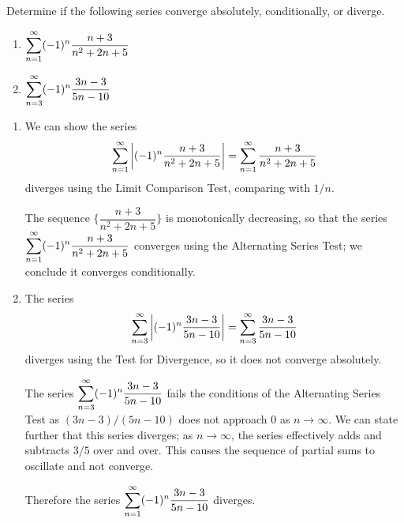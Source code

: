 \begin{example}\label{ex_alt_series2}%
Determine if the following series converge absolutely, conditionally, or diverge.\\
\begin{minipage}{.5\textwidth}
 \begin{enumerate}
  \item $\displaystyle\sum_{n=1}^\infty (-1)^n\frac{n+3}{n^2+2n+5}$
 \end{enumerate}
\end{minipage}%
\begin{minipage}{.5\textwidth}
 \begin{enumerate}\setcounter{enumi}{1}
  \item $\displaystyle\sum_{n=3}^\infty (-1)^n\frac{3n-3}{5n-10}$
 \end{enumerate}
\end{minipage}
\solution
\begin{enumerate}
	\item We can show the series
	\[\sum_{n=1}^\infty \left\lvert (-1)^n\frac{n+3}{n^2+2n+5} \right\rvert= \sum_{n=1}^\infty \frac{n+3}{n^2+2n+5}\]
	diverges using the Limit Comparison Test, comparing with $1/n$. 
	
	The sequence $\{\dfrac{n+3}{n^2+2n+5}\}$ is monotonically decreasing, so that the series $\displaystyle \sum_{n=1}^\infty (-1)^n\frac{n+3}{n^2+2n+5}$ converges using the Alternating Series Test; we conclude it converges conditionally.
	
%	
	
	\item	The series
	\[\sum_{n=3}^\infty \left\lvert (-1)^n\frac{3n-3}{5n-10} \right\rvert = \sum_{n=3}^\infty \frac{3n-3}{5n-10}\]
	diverges using the Test for Divergence, so it does not converge absolutely. 
	
	The series $\displaystyle \sum_{n=3}^\infty (-1)^n\frac{3n-3}{5n-10}$ fails the conditions of the Alternating Series Test as $(3n-3)/(5n-10)$ does not approach $0$ as $n\to\infty$. We can state further that this series diverges; as $n\to\infty$, the series effectively adds and subtracts $3/5$ over and over. This causes the sequence of partial sums to oscillate and not converge.
	
	Therefore the series $\displaystyle \sum_{n=1}^\infty (-1)^n\frac{3n-3}{5n-10}$ diverges.
\end{enumerate}
\end{example}

